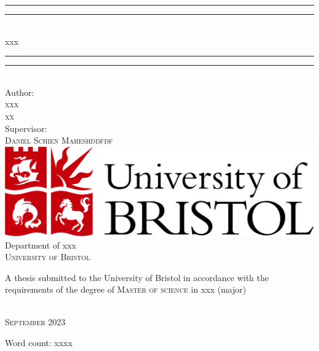 \begin{titlepage}

\vspace*{13mm}

\begin{center}
\rule[0.5ex]{\linewidth}{2pt}\vspace*{-\baselineskip}\vspace*{3.2pt}
\rule[0.5ex]{\linewidth}{1pt}\\[\baselineskip]
{\LARGE xxx}\\[4mm]
\rule[0.5ex]{\linewidth}{1pt}\vspace*{-\baselineskip}\vspace{3.2pt}
\rule[0.5ex]{\linewidth}{2pt}\\

\vspace{6.5mm}
{\large Author: \\
\textsc{xxx}\\
\textsc{xx}}\\

\vspace{6.5mm}
{\large Supervisor: \\
\textsc{Daniel Schien Maheshddfdf}}\\

\vspace{11mm}
\includegraphics[scale=0.2]{logos/bristollogo_colour}\\
\vspace{6mm}
{\large Department of xxx\\
\vspace{6mm}
\textsc{University of Bristol}}\\
\vspace{6mm}
\begin{minipage}{10cm}
A thesis submitted to the University of Bristol in accordance with the requirements of the degree of \textsc{Master of science} in xxx (major)
\end{minipage}\\
\vspace{11mm}
{\large\textsc{September 2023}}
\vspace{11mm}
\end{center}

\begin{flushright}
{\small Word count: xxxx}
\end{flushright}

\end{titlepage}